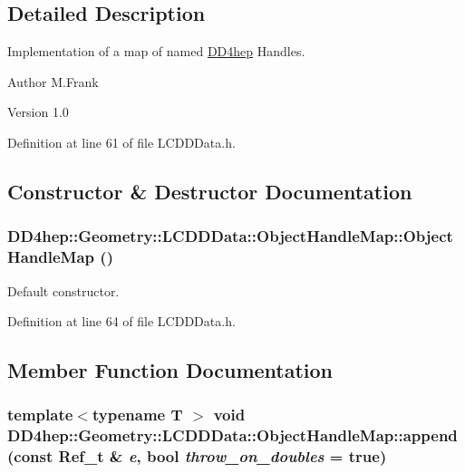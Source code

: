 \subsection{Detailed Description}
Implementation of a map of named \hyperlink{namespace_d_d4hep}{DD4hep} Handles. \begin{DoxyAuthor}{Author}
M.Frank 
\end{DoxyAuthor}
\begin{DoxyVersion}{Version}
1.0 
\end{DoxyVersion}


Definition at line 61 of file LCDDData.h.

\subsection{Constructor \& Destructor Documentation}
\hypertarget{class_d_d4hep_1_1_geometry_1_1_l_c_d_d_data_1_1_object_handle_map_aacc5d9dd1f2e355617b5a215c66f924b}{
\subsubsection[{ObjectHandleMap}]{\setlength{\rightskip}{0pt plus 5cm}DD4hep::Geometry::LCDDData::ObjectHandleMap::ObjectHandleMap ()}}
\label{class_d_d4hep_1_1_geometry_1_1_l_c_d_d_data_1_1_object_handle_map_aacc5d9dd1f2e355617b5a215c66f924b}


Default constructor. 

Definition at line 64 of file LCDDData.h.

\subsection{Member Function Documentation}
\hypertarget{class_d_d4hep_1_1_geometry_1_1_l_c_d_d_data_1_1_object_handle_map_a8881f90a02ef95a6a2e558f092e8f81a}{
\subsubsection[{append}]{\setlength{\rightskip}{0pt plus 5cm}template$<$typename T $>$ void DD4hep::Geometry::LCDDData::ObjectHandleMap::append (const {\bf Ref\_\-t} \& {\em e}, \/  bool {\em throw\_\-on\_\-doubles} = {\ttfamily true})}}
\label{class_d_d4hep_1_1_geometry_1_1_l_c_d_d_data_1_1_object_handle_map_a8881f90a02ef95a6a2e558f092e8f81a}


